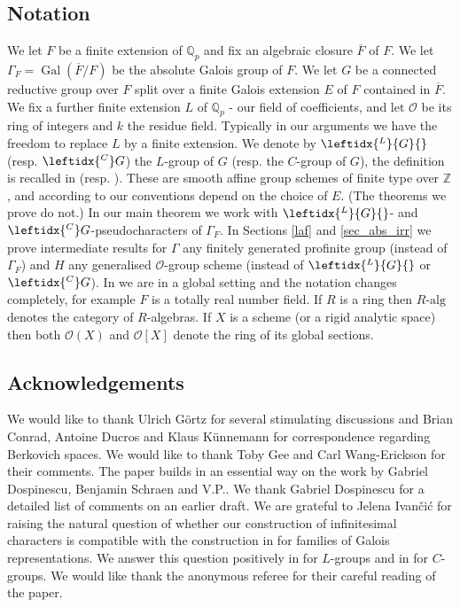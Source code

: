 \documentclass{amsart}
\theoremstyle{definition}
\theoremstyle{remark}
\DeclareMathOperator{\Gal}{Gal}
\newcommand{\Qp}{\mathbb {Q}_p}
\newcommand{\ZZ}{\mathbb Z}
\newcommand{\OO}{\mathcal O}
\newcommand{\alg}{\mathrm{alg}}
\newcommand{\LG}{\leftidx{^L}{G}{}}
\newcommand{\CG}{\leftidx{^C}G{}}
\begin{document}
\subsection{Notation} We let $F$ be a finite extension of $\Qp$ and fix an algebraic closure $\overline{F}$ of $F$. We let $\Gamma_F=\Gal(\overline{F}/F)$ be 
the absolute Galois group of $F$. We let $G$ be a connected reductive group over $F$ split over a finite Galois extension $E$ of $F$ contained in $\overline{F}$. 
We fix a further finite extension $L$ of $\Qp$ - our field of coefficients, and 
let $\OO$ be its ring of integers and $k$ the residue field. Typically in our arguments we have the freedom 
to replace $L$ by a finite extension. We denote by $\LG$ (resp. $\CG$) the $L$-group of 
$G$ (resp. the $C$-group of $G$), the definition is recalled
in  (resp. ). 
These are smooth affine group schemes of finite type over $\ZZ$, and according to our conventions depend on the choice of $E$. (The theorems we prove do not.) In our main theorem we work with $\LG$- and $\CG$-pseudocharacters of $\Gamma_F$. In Sections \ref{laf} and \ref{sec_abs_irr} we prove intermediate results for $\Gamma$ any finitely generated profinite group (instead of $\Gamma_F$) and $H$ any generalised $\OO$-group scheme 
(instead of $\LG$ or $\CG$). In  we are in a global setting and the notation changes completely, for example $F$ is a totally real number field. If $R$ is a ring then 
$R\text{-}\alg$ denotes the category of $R$-algebras. If $X$ is a scheme (or a rigid analytic space) then  both $\OO(X)$ and $\OO[X]$ denote the ring of its global sections. 



\subsection{Acknowledgements} We would like to thank 
Ulrich G\"ortz for several stimulating discussions and Brian Conrad, Antoine Ducros  and Klaus K\"unnemann for correspondence regarding Berkovich spaces. We would like to thank Toby Gee and Carl Wang-Erickson for their comments. The paper builds in an essential way on 
the work \cite{DPS} by Gabriel Dospinescu, Benjamin Schraen and V.P.. We thank Gabriel Dospinescu for a detailed list of comments on an earlier draft.  We are grateful to 
Jelena Ivan\v{c}i\'c for raising the natural
question of whether our construction of infinitesimal characters is compatible with
the construction in \cite{DPS} for families of
Galois representations. We answer this question
positively in  for
$L$-groups and in  for
$C$-groups. We would like thank the anonymous
referee for their careful reading of the paper. 
\end{document}
